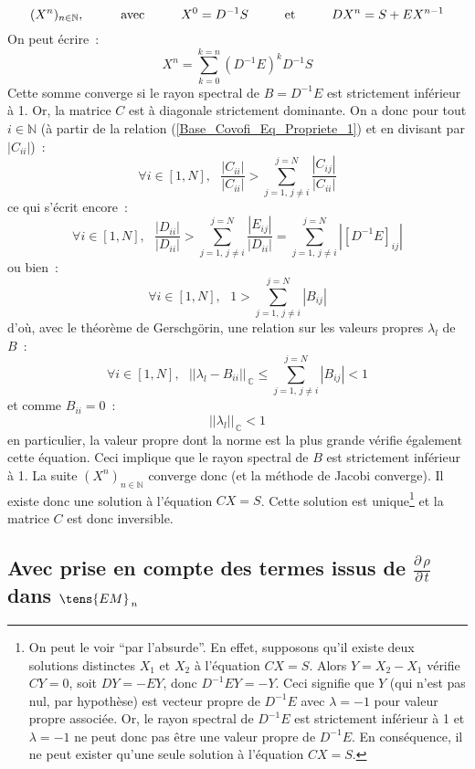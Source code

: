 $$(X^n)_{n\in\mathbb{N}}, \text{\hspace*{1cm}avec\hspace*{1cm}} X^0=D^{-1}S
\text{\hspace*{1cm}et\hspace*{1cm}} DX^n=S+EX^{n-1}$$
On peut \'ecrire~:
$$X^n = \sum\limits_{k=0}^{k=n} \left(D^{-1}E\right)^k D^{-1}S$$
Cette somme converge si
le rayon spectral de $B=D^{-1}E$ est strictement inf\'erieur \`a 1. Or, la
matrice $C$ est \`a diagonale strictement dominante. On a donc pour tout $i\in\mathbb{N}$
(\`a partir de la relation (\ref{Base_Covofi_Eq_Propriete_1}) et en
divisant par $|C_{ii}|$)~:
$$\forall i \in [1,N],\ \ \ \frac{|C_{ii}|}{|C_{ii}|} > \sum\limits_{j=1,\,j\neq
i}^{j=N}\frac{|C_{ij}|}{|C_{ii}|}$$ ce qui s'\'ecrit encore~:
$$\forall i \in [1,N],\ \ \ \frac{|D_{ii}|}{|D_{ii}|} > \sum\limits_{j=1,\,j\neq
i}^{j=N}\frac{|E_{ij}|}{|D_{ii}|}=\sum\limits_{j=1,\,j\neq
i}^{j=N}|\left[D^{-1}E\right]_{ij}|$$ ou bien~:
$$\forall i \in [1,N],\ \ \  1 > \sum\limits_{j=1,\,j\neq
i}^{j=N}|B_{ij}|$$  d'o\`u, avec le th\'eor\`eme de Gerschg\"orin, une
relation sur les valeurs propres $\lambda_l$ de $B$~:
$$\forall i \in [1,N],\ \ \  ||\lambda_l - B_{ii}||_{\,\mathbb{C}} \leqslant \sum\limits_{j=1,\,j\neq i}^{j=N}|B_{ij}| < 1 $$
et comme $B_{ii}=0$~:
$$ ||\lambda_l ||_{\,\mathbb{C}}  < 1 $$
en particulier, la valeur propre dont la norme est la plus grande v\'erifie
\'egalement cette
\'equation. Ceci implique que le rayon spectral de $B$ est strictement
inf\'erieur \`a 1. La suite $(X^n)_{n\in\mathbb{N}}$ converge donc (et la m\'ethode
de Jacobi converge). Il existe donc une solution \`a l'\'equation  $CX=S$. Cette
solution est unique\footnote{On peut le voir ``par l'absurde''.
En effet, supposons qu'il existe deux solutions
distinctes $X_1$ et $X_2$ \`a l'\'equation  $CX=S$. Alors $Y=X_2-X_1$ v\'erifie
$CY=0$, soit $DY=-EY$, donc $D^{-1}EY=-Y$. Ceci signifie que $Y$
(qui n'est pas nul, par
hypoth\`ese) est vecteur propre de $D^{-1}E$ avec $\lambda=-1$ pour valeur
propre associ\'ee. Or, le rayon spectral de $D^{-1}E$ est strictement
inf\'erieur \`a 1 et $\lambda=-1$ ne peut donc pas \^etre une valeur propre de
$D^{-1}E$.  En cons\'equence, il ne peut exister qu'une seule solution
\`a l'\'equation  $CX=S$.} et la matrice $C$ est donc inversible.


\subsection*{Avec prise en compte des termes issus de
$\displaystyle \frac{{\partial}\,\rho}{{\partial}\,t}$ dans  $\tens{EM}_{\,n}$}
\label{Base_Covofi_Avecdrhodt}
